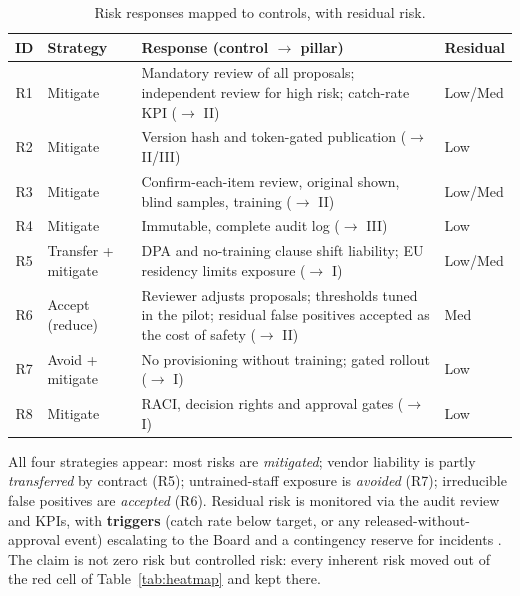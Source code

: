 \documentclass[12pt,a4paper]{article}
\begin{document}
\begin{table}[H]
\centering
\small
{}
\begin{tabular}{@{} c p{2.4cm} p{8.2cm} >{\centering\arraybackslash}p{1.9cm} @{}}
\toprule
\textbf{\color{accentdark}ID} & \textbf{\color{accentdark}Strategy} & \textbf{\color{accentdark}Response (control $\rightarrow$ pillar)} & \textbf{\color{accentdark}Residual} \\
\midrule
R1 & Mitigate & Mandatory review of all proposals; independent review for high risk; catch-rate KPI ($\rightarrow$ II) & Low/Med \\
R2 & Mitigate & Version hash and token-gated publication ($\rightarrow$ II/III) & Low \\
R3 & Mitigate & Confirm-each-item review, original shown, blind samples, training ($\rightarrow$ II) & Low/Med \\
R4 & Mitigate & Immutable, complete audit log ($\rightarrow$ III) & Low \\
R5 & Transfer + mitigate & DPA and no-training clause shift liability; EU residency limits exposure ($\rightarrow$ I) & Low/Med \\
R6 & Accept (reduce) & Reviewer adjusts proposals; thresholds tuned in the pilot; residual false positives accepted as the cost of safety ($\rightarrow$ II) & Med \\
R7 & Avoid + mitigate & No provisioning without training; gated rollout ($\rightarrow$ I) & Low \\
R8 & Mitigate & RACI, decision rights and approval gates ($\rightarrow$ I) & Low \\
\bottomrule
\end{tabular}
\caption{Risk responses mapped to controls, with residual risk.}
\label{tab:responses}
\end{table}

All four strategies appear: most risks are \emph{mitigated}; vendor liability is partly \emph{transferred} by contract (R5); untrained-staff exposure is \emph{avoided} (R7); irreducible false positives are \emph{accepted} (R6). Residual risk is monitored via the audit review and KPIs, with \textbf{triggers} (catch rate below target, or any released-without-approval event) escalating to the Board and a contingency reserve for incidents \cite{falchi_slides}. The claim is not zero risk but controlled risk: every inherent risk moved out of the red cell of Table~\ref{tab:heatmap} and kept there.

\end{document}
